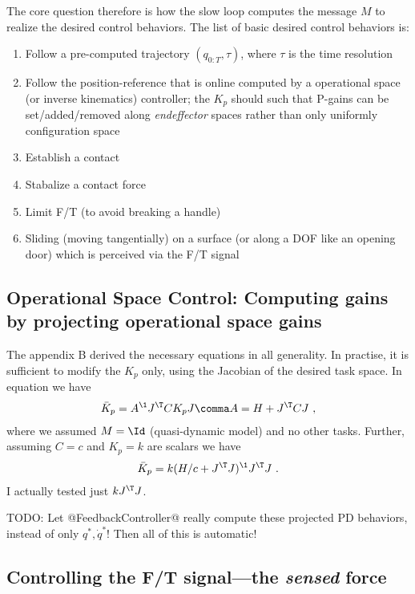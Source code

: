 \documentclass[10pt,fleqn,twoside]{article}
\begin{document}
{{The core question therefore is how the slow loop computes the message
$M$ to realize the desired control behaviors. The list of basic desired
control behaviors is:
\begin{enumerate}
\item Follow a pre-computed trajectory $(q_{0:T},\tau)$, where $\tau$
is the time resolution
\item Follow the position-reference that is online computed by a
operational space (or inverse kinematics) controller; the $K_p$ should
such that P-gains can be set/added/removed along \emph{endeffector}
spaces rather than only uniformly configuration space
\item Establish a contact
\item Stabalize a contact force
\item Limit F/T (to avoid breaking a handle)
\item Sliding (moving tangentially) on a surface (or along a DOF like
  an opening door) which is perceived via the F/T signal
\end{enumerate}


\subsection{Operational Space Control: Computing gains by projecting
operational space gains}

The appendix B derived the necessary equations in all generality. In
practise, it is sufficient to modify the $K_p$ only, using the
Jacobian of the desired task space. In equation  we have
\begin{align}
\bar K_p = A^\1 J^\T C K_p J \comma A = H + J^\T C J ~,
\end{align}
where we assumed $M=\Id$ (quasi-dynamic model) and no other
tasks. Further, assuming $C=c$ and $K_p=k$ are scalars we have
\begin{align}
\bar K_p = k(H/c+J^\T J)^\1 J^\T J ~.
\end{align}
I actually tested just $k J^\T J$.

TODO: Let @FeedbackController@ really compute these projected PD
behaviors, instead of only $q^*,\dot q^*$! Then all of this is
automatic!



\subsection{Controlling the F/T signal---the \emph{sensed} force}

}}
\end{document}
